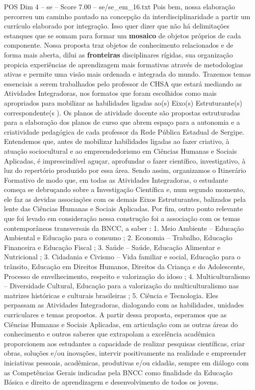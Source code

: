 \begin{textsample}{POS Dim 4 – se – Score 7.00 – se/se\_em\_16.txt}
Pois bem, nossa elaboração percorreu um caminho pautado na concepção da interdisciplinaridade a partir um currículo elaborado por integração.
Isso quer dizer que não há delimitações estanques que se somam para formar um \textbf{mosaico} de objetos próprios de cada componente.
Nossa proposta traz objetos de conhecimento relacionados e de forma mais aberta, dilui as \textbf{fronteiras} disciplinares rígidas, sua organização propicia experiências de aprendizagem mais formativas através de metodologias ativas e permite uma visão mais ordenada e integrada do mundo.
Trazemos temas essenciais a serem trabalhados pelo professor de CHSA que estará mediando as Atividades Integradoras, nos formatos que foram escolhidos como mais apropriados para mobilizar as habilidades ligadas ao(s) Eixo(s) Estruturante(s) correspondente(s ).
Os planos de atividade docente são propostas estruturadas para a elaboração dos planos de curso que abrem espaço para a autonomia e a criatividade pedagógica de cada professor da Rede Pública Estadual de Sergipe.
Entendemos que, antes de mobilizar habilidades ligadas ao fazer criativo, à atuação sociocultural e ao empreendedorismo em Ciências Humanas e Sociais Aplicadas, é imprescindível aguçar, aprofundar o fazer científico, investigativo, à luz do repertório produzido por essa área.
Sendo assim, organizamos o Itinerário Formativo de modo que, em todas as Atividades Integradoras, o estudante começa se debruçando sobre a Investigação Científica e, num segundo momento, ele faz as devidas associações com os demais Eixos Estruturantes, balizados pela lente das Ciências Humanas e Sociais Aplicadas.
Por fim, outro ponto relevante que foi levado em consideração nessa construção foi a associação com os temas contemporâneos transversais da BNCC, a saber : 1.
Meio Ambiente – Educação Ambiental e Educação para o consumo ; 2.
Economia – Trabalho, Educação Financeira e Educação Fiscal ; 3.
Saúde – Saúde, Educação Alimentar e Nutricional ; 3.
Cidadania e Civismo – Vida familiar e social, Educação para o trânsito, Educação em Direitos Humanos, Direitos da Criança e do Adolescente, Processo de envelhecimento, respeito e valorização do idoso ; 4.
Multiculturalismo – Diversidade Cultural, Educação para a valorização do multiculturalismo nas matrizes históricas e culturais brasileiras ; 5.
Ciência e Tecnologia.
Eles perpassam as Atividades Integradoras, dialogando com as habilidades, unidades curriculares e temas propostos.
A partir dessa proposta, esperamos que as Ciências Humanas e Sociais Aplicadas, em articulação com as outras áreas do conhecimento e outros saberes que extrapolam a excelência acadêmica proporcionem aos estudantes a capacidade de realizar pesquisas científicas, criar obras, soluções e/ou inovações, intervir positivamente na realidade e empreender iniciativas pessoais, acadêmicas, produtivas e/ou cidadãs, sempre em diálogo com as Competências Gerais indicadas pela BNCC como finalidade da Educação Básica e direito de aprendizagem e desenvolvimento de todos os jovens.

\end{textsample}
